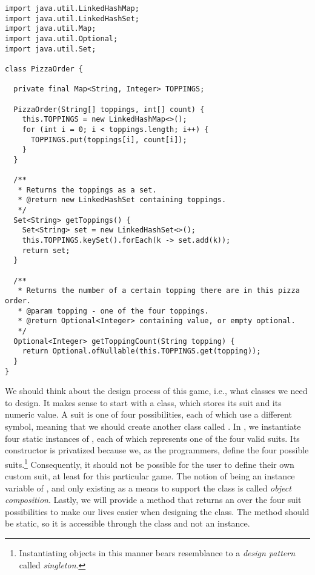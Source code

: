\begin{lstlisting}[language=MyJava]
import java.util.LinkedHashMap;
import java.util.LinkedHashSet;
import java.util.Map;
import java.util.Optional;
import java.util.Set;

class PizzaOrder {

  private final Map<String, Integer> TOPPINGS;

  PizzaOrder(String[] toppings, int[] count) {
    this.TOPPINGS = new LinkedHashMap<>();
    for (int i = 0; i < toppings.length; i++) {
      TOPPINGS.put(toppings[i], count[i]);
    }
  }

  /**
   * Returns the toppings as a set.
   * @return new LinkedHashSet containing toppings.
   */
  Set<String> getToppings() {
    Set<String> set = new LinkedHashSet<>();
    this.TOPPINGS.keySet().forEach(k -> set.add(k));
    return set;
  }

  /**
   * Returns the number of a certain topping there are in this pizza order.
   * @param topping - one of the four toppings.
   * @return Optional<Integer> containing value, or empty optional.
   */
  Optional<Integer> getToppingCount(String topping) {
    return Optional.ofNullable(this.TOPPINGS.get(topping));
  }
}
\end{lstlisting}

We should think about the design process of this game, i.e., what classes we need to design. 
It makes sense to start with a  class, which stores its suit and its numeric value. 
A suit is one of four possibilities, each of which use a different symbol, meaning that we should create another class called . 
In , we instantiate four static instances of , each of which represents one of the four valid suits. 
Its constructor is privatized because we, as the programmers, define the four possible suits.\footnote{Instantiating objects in this manner bears resemblance to a \emph{design pattern} called \emph{singleton}.} 
Consequently, it should not be possible for the user to define their own custom suit, at least for this particular game. 
The notion of  being an instance variable of , and only existing as a means to support the  class is called \emph{object composition}. 
Lastly, we will provide a method that returns an  over the four suit possibilities to make our lives easier when designing the  class. 
The method should be static, so it is accessible through the class and not an instance.

